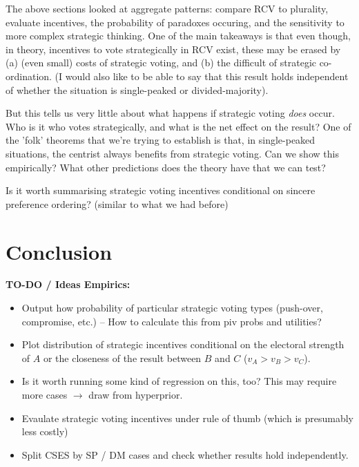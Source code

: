 \documentclass[11pt, letter, margin = 2 in]{article}
\begin{document}
The above sections looked at aggregate patterns: compare RCV to plurality, evaluate incentives, the probability of paradoxes occuring, and the sensitivity to more complex strategic thinking. One of the main takeaways is that even though, in theory, incentives to vote strategically in RCV exist, these may be erased by (a) (even small) costs of strategic voting, and (b) the difficult of strategic co-ordination. (I would also like to be able to say that this result holds independent of whether the situation is single-peaked or divided-majority).

But this tells us very little about what happens if strategic voting \textit{does} occur. Who is it who votes strategically, and what is the net effect on the result? One of the 'folk' theorems that we're trying to establish is that, in single-peaked situations, the centrist always benefits from strategic voting. Can we show this empirically? What other predictions does the theory have that we can test? 

Is it worth summarising strategic voting incentives conditional on sincere preference ordering? (similar to what we had before)

\section{Conclusion}

\textbf{TO-DO / Ideas Empirics:}

\begin{itemize}
\item Output how probability of particular strategic voting types (push-over, compromise, etc.) -- How to calculate this from piv probs and utilities?
\item Plot distribution of strategic incentives conditional on the electoral strength of $A$ or the closeness of the result between $B$ and $C$ ($v_A > v_B > v_C$).
\item Is it worth running some kind of regression on this, too? This may require more cases $\rightarrow$ draw from hyperprior.
\item Evaulate strategic voting incentives under rule of thumb (which is presumably less costly)
\item Split CSES by SP / DM cases and check whether results hold independently.

\end{itemize}
\end{document}
